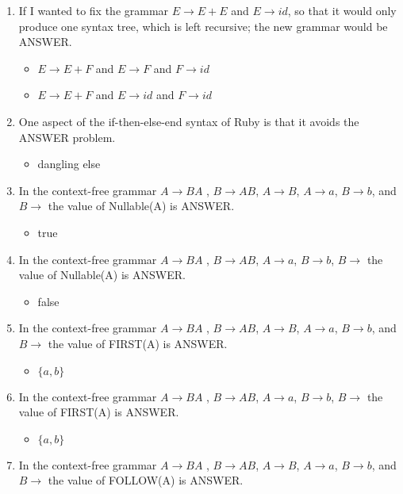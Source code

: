 \documentclass{exam}
\begin{document}
\begin{enumerate}
\item If I wanted to fix the grammar $E \rightarrow E + E$ and $E \rightarrow id$, so that it would only produce one syntax tree, which is left recursive; the new grammar would be ANSWER.
\begin{itemize}
\item $E \rightarrow E + F$ and $E \rightarrow F$ and $F \rightarrow id$
\item $E \rightarrow E + F$ and $E \rightarrow id$ and $F \rightarrow id$
\end{itemize}
\item One aspect of the if-then-else-end syntax of Ruby is that it avoids the ANSWER problem.
\begin{itemize}
\item dangling else
\end{itemize}
\item In the context-free grammar $A \rightarrow B A$ , $B \rightarrow A B$, $A \rightarrow B$, $A \rightarrow a$, $B \rightarrow b$, and $B \rightarrow$  the value of Nullable(A) is ANSWER.
\begin{itemize}
\item true
\end{itemize}
\item In the context-free grammar $A \rightarrow B A$ , $B \rightarrow A B$, $A \rightarrow a$, $B \rightarrow b$, $B \rightarrow$  the value of Nullable(A) is ANSWER.
\begin{itemize}
\item false
\end{itemize}
\item In the context-free grammar $A \rightarrow B A$ , $B \rightarrow A B$, $A \rightarrow B$, $A \rightarrow a$, $B \rightarrow b$, and $B \rightarrow$  the value of FIRST(A) is ANSWER.
\begin{itemize}
\item $\{a,b\}$
\end{itemize}
\item In the context-free grammar $A \rightarrow B A$ , $B \rightarrow A B$, $A \rightarrow a$, $B \rightarrow b$, $B \rightarrow$  the value of FIRST(A) is ANSWER.
\begin{itemize}
\item $\{a,b\}$
\end{itemize}
\item In the context-free grammar $A \rightarrow B A$ , $B \rightarrow A B$, $A \rightarrow B$, $A \rightarrow a$, $B \rightarrow b$, and $B \rightarrow$  the value of FOLLOW(A) is ANSWER.

\end{enumerate}
\end{document}
